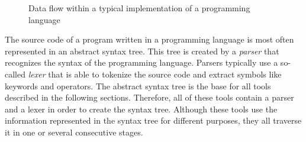 \begin{figure}
\caption{Data flow within a typical implementation of a programming language}
\label{fig:extdataflow}
\end{figure}

The source code of a program written in a programming language is most often represented in an abstract syntax tree.
This tree is created by a \emph{parser} that recognizes the syntax of the programming language.
Parsers typically use a so-called \emph{lexer} that is able to tokenize the source code and extract symbols like keywords and operators.
The abstract syntax tree is the base for all tools described in the following sections.
Therefore, all of these tools contain a parser and a lexer in order to create the syntax tree.
Although these tools use the information represented in the syntax tree for different purposes, they all traverse it in one or several consecutive stages.

